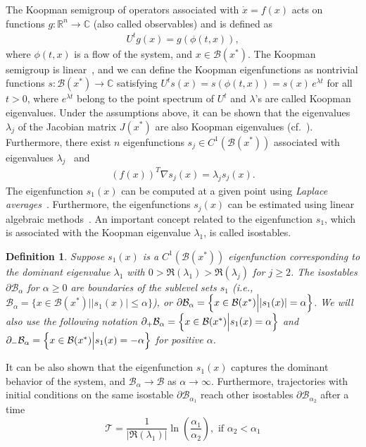 \documentclass[letterpaper, 10pt, journal]{IEEEtran}  %
\newcommand{\R}{{\mathbb R}}
\newcommand{\C}{{\mathbb C}}
\newcommand{\cB}{{\mathcal B}}
\newcommand{\cT}{{\mathcal T}}
\newtheorem{defn}{Definition}
\begin{document}
The Koopman semigroup of operators associated with $\dot x = f(x)$ acts on functions $g:\R^n\to \C$ (also called observables) and is defined as 
\begin{gather}
U^t g(x) = g(\phi(t,x)),
\end{gather}
 where $\phi(t,x)$ is a flow of the system, and $x\in\cB(x^\ast)$. The Koopman semigroup is linear~\cite{mezic2005}, and we can define the Koopman eigenfunctions as nontrivial functions $s:\cB(x^\ast)\rightarrow \C$ satisfying $U^t s(x) = s(\phi(t, x)) = s(x) \, e^{\lambda t}$ for all $t>0$, where $e^{\lambda t}$ belong to the point spectrum of $U^t$ and $\lambda$'s are called Koopman eigenvalues. Under the assumptions above, it can be shown that the eigenvalues $\lambda_j$ of the Jacobian matrix $J(x^\ast)$ are also Koopman eigenvalues (cf.~\cite{mauroy2014global}). Furthermore, there exist $n$ eigenfunctions $s_j \in C^1(\cB(x^\ast))$ associated with eigenvalues $\lambda_j$~\cite{mauroy2014global} and
\begin{gather}
(f(x))^T \nabla s_j(x) = \lambda_j s_j(x). \label{eq:s-one}
\end{gather}
The eigenfunction $s_1(x)$ can be computed at a given point using  \emph{Laplace averages}~\cite{mauroy2013isostables}. Furthermore, the eigenfunctions $s_j(x)$  can be estimated using linear algebraic methods~\cite{mauroy2014global}. An important concept related to the eigenfunction $s_1$, which is associated with the Koopman eigenvalue $\lambda_1$, is called isostables.

\begin{defn} Suppose $s_1(x)$ is a $C^1(\cB(x^\ast))$ eigenfunction corresponding to the dominant eigenvalue $\lambda_1$ with $0> \Re(\lambda_1) > \Re(\lambda_j)$ for $j\ge 2$. The \emph{isostables} $\partial \cB_\alpha$ for $\alpha\ge 0$ are boundaries of the sublevel sets $s_1$ (i.e., $\cB_\alpha =  \{x \in \cB(x^\ast) | |s_1(x)| \le \alpha \}$), or $\partial\cB_\alpha=\left\{x \in \cB(x^\ast)\Bigl| |s_1(x)|=\alpha\right\}$. 
We will also use the following notation $\partial_+ \cB_\alpha=\left\{x\in \cB(x^\ast)\Bigl| s_1(x) = \alpha\right\}$ and $\partial_- \cB_\alpha=\left\{x\in \cB(x^\ast)\Bigl| s_1(x) = -\alpha\right\}$ for positive $\alpha$.
\end{defn}

It can be also shown that the eigenfunction $s_1(x)$ captures the dominant behavior of the system, and $\cB_\alpha\rightarrow\cB$ as $\alpha\rightarrow\infty$. Furthermore, trajectories with initial conditions on the same isostable $\partial \cB_{\alpha_1}$ reach other isostables $\partial \cB_{\alpha_2}$ after a time
\begin{equation}
\label{time_isostable}
\cT = \frac{1}{|\Re(\lambda_1)|} \ln \left(\frac{\alpha_1}{\alpha_2}\right), \text{ if } \alpha_2 < \alpha_1
\end{equation}
\end{document}
